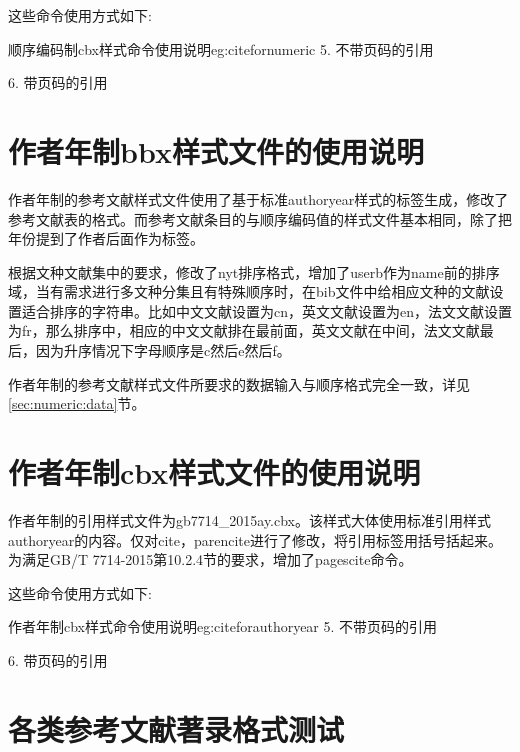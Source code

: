 \documentclass[11pt]{article} %
\newcommand{\qd}[1]{%
{\fangsong\color{blue}#1}}
\begin{document}
这些命令使用方式如下:

\begin{codetex}{顺序编码制cbx样式命令使用说明}{eg:citefornumeric}
5. 不带页码的引用\cite{Peebles2001-100-100}\parencite{Miroslav2004--}

6. 带页码的引用\cite[见][49页]{蔡敏2006--}\parencite[见][49页]{Miroslav2004--}
\end{codetex}

\section{作者年制bbx样式文件的使用说明}

作者年制的参考文献样式文件使用了基于标准authoryear样式的标签生成，修改了参考文献表的格式。而参考文献条目的与顺序编码值的样式文件基本相同，除了把年份提到了作者后面作为标签。

\qd{根据文种文献集中的要求，修改了nyt排序格式，增加了userb作为name前的排序域，当有需求进行多文种分集且有特殊顺序时，在bib文件中给相应文种的文献设置适合排序的字符串。比如中文文献设置为cn，英文文献设置为en，法文文献设置为fr，那么排序中，相应的中文文献排在最前面，英文文献在中间，法文文献最后，因为升序情况下字母顺序是c然后e然后f。}

作者年制的参考文献样式文件所要求的数据输入与顺序格式完全一致，详见
\ref{sec:numeric:data}节。

\section{作者年制cbx样式文件的使用说明}

作者年制的引用样式文件为gb7714\_2015ay.cbx。该样式大体使用标准引用样式authoryear的内容。仅对cite，parencite进行了修改，将引用标签用括号括起来。为满足GB/T 7714-2015第10.2.4节的要求，增加了pagescite命令。

这些命令使用方式如下:

\begin{codetex}{作者年制cbx样式命令使用说明}{eg:citeforauthoryear}
5. 不带页码的引用\cite{Peebles2001-100-100}\parencite{Miroslav2004--}

6. 带页码的引用\cite[见][49页]{蔡敏2006--}\parencite[见][49页]{Miroslav2004--}
\end{codetex}

\section{各类参考文献著录格式测试}
\end{document}
